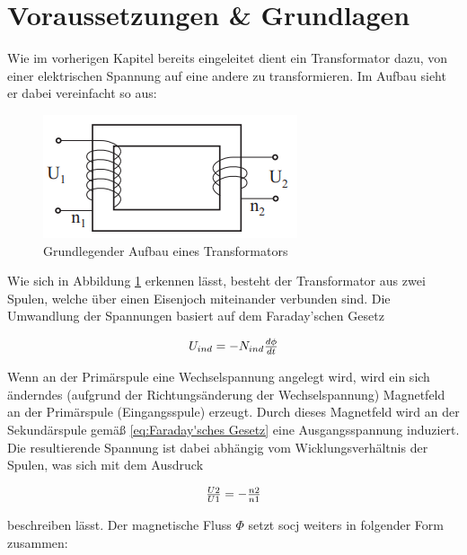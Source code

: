 \documentclass[12pt,a4paper,twoside]{article}
\begin{document}
\section{Voraussetzungen \& Grundlagen} %

Wie im vorherigen Kapitel bereits eingeleitet dient ein Transformator dazu, von einer elektrischen Spannung auf eine andere zu transformieren. Im Aufbau sieht er dabei vereinfacht so aus:

\begin{figure}[H]
    \centering
    \includegraphics[width=0.5\linewidth]{nudes/GL-TrafoAufbau.png}
    \caption{Grundlegender Aufbau eines Transformators \cite{teachcenter1}}
    \label{fig:Aufbau Transformator}
\end{figure}

\noindent
Wie sich in Abbildung \ref{fig:Aufbau Transformator} erkennen lässt, besteht der Transformator aus zwei Spulen, welche über einen Eisenjoch miteinander verbunden sind. Die Umwandlung der Spannungen basiert auf dem Faraday'schen Gesetz

    \begin{equation}
        \label{eq:Faraday'sches Gesetz}
        \centerline{$U_{ind}=-N_{ind}\frac{d \phi}{dt}$}
    \end{equation}

\noindent
Wenn an der Primärspule eine Wechselspannung angelegt wird, wird ein sich änderndes (aufgrund der Richtungsänderung der Wechselspannung) Magnetfeld an der Primärspule (Eingangsspule) erzeugt. Durch dieses Magnetfeld wird an der Sekundärspule gemäß \ref{eq:Faraday'sches Gesetz} eine Ausgangsspannung induziert. 
Die resultierende Spannung ist dabei abhängig vom Wicklungsverhältnis der Spulen, was sich mit dem Ausdruck

\begin{equation}
    \label{eq:Verhältnis Wicklungen/Spannung}
    \centerline{$\frac{U2}{U1}=-\frac{n2}{n1}$}
\end{equation}

\noindent
beschreiben lässt. Der magnetische Fluss $\Phi$ setzt socj weiters in folgender Form zusammen:
\end{document}
